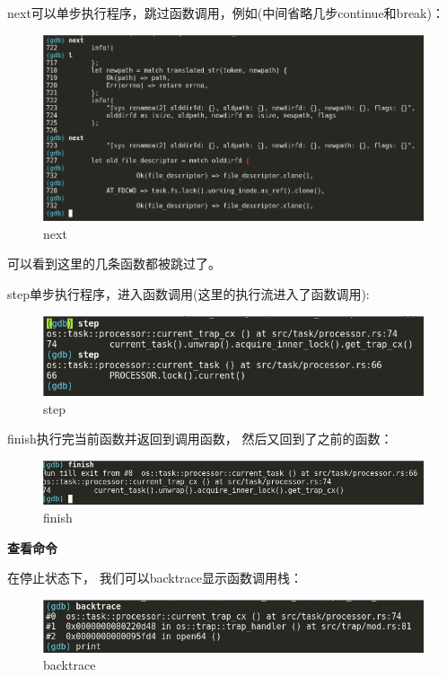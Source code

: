 next可以单步执行程序，跳过函数调用，例如(中间省略几步continue和break)：

\begin{figure}[htb]
\centering
\includegraphics[width=\textwidth]{figures/02-02-next.png}
\caption{
	next
}
\label{fig:next}
\end{figure}

可以看到这里的几条函数都被跳过了。

step单步执行程序，进入函数调用(这里的执行流进入了函数调用):

\begin{figure}[htb]
\centering
\includegraphics[width=\textwidth]{figures/02-02-step.png}
\caption{
	step
}
\label{fig:step}
\end{figure}

finish执行完当前函数并返回到调用函数， 然后又回到了之前的函数：

\begin{figure}[htb]
\centering
\includegraphics[width=\textwidth]{figures/02-02-finish.png}
\caption{
	finish
}
\label{fig:finish}
\end{figure}

\textbf{查看命令}

在停止状态下， 我们可以backtrace显示函数调用栈：

\begin{figure}[htb]
\centering
\includegraphics[width=\textwidth]{figures/02-02-backtrace.png}
\caption{
	backtrace
}
\label{fig:backtrace}
\end{figure}

